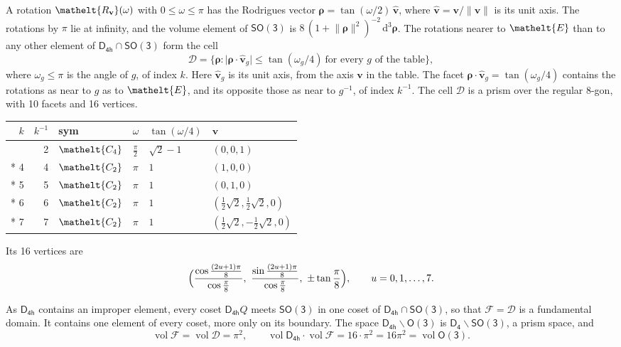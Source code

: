 \documentclass[10pt,a4paper]{article}
\numberwithin{equation}{section}
\newcommand{\eltfont}[1]{{\let\sigma\eltsigma\mathelt{#1}}}
\newcommand{\grp}[1]{\mathsf{#1}}
\newcommand{\cls}[1]{\eltfont{#1}}
\newcommand{\elt}[1]{\eltfont{#1}}
\newcommand{\dirvec}[3]{(#1, #2, #3)}
\newcommand{\unitaxis}{\hat{\mathbf{v}}}
\newcommand{\vv}{\mathbf{v}}
\newcommand{\diff}{\mathrm{d}}
\newcommand{\vol}{\operatorname{vol}}
\newcommand{\rodrigues}{\boldsymbol{\rho}}
\newcommand{\fcell}{\mathcal{D}}
\newcommand{\fdomain}{\mathcal{F}}
\begin{document}
\leavevmode\label{n:vector.rodrigues}\label{n:vector.unitaxis}A rotation $\elt{R_{\vv}}(\omega)$ with $0 \le \omega \le \pi$ has the Rodrigues vector $\rodrigues = \tan(\omega/2)\,\unitaxis$, where $\unitaxis = \vv/\lVert\vv\rVert$ is its unit axis. The rotations by $\pi$ lie at infinity, and the volume element of \href{SO3.pdf}{$\grp{SO(3)}$} is $8\,(1 + \lVert\rodrigues\rVert^2)^{-2}\,\diff^3\rodrigues$.
\leavevmode\label{n:set.cell}The rotations nearer to $\elt{E}$ than to any other element of $\grp{D_{4h}} \cap \grp{SO(3)}$ form the cell
\begin{equation}\label{e:cell}\fcell = \bigl\{\rodrigues : \lvert\rodrigues\cdot\unitaxis_g\rvert \le \tan(\omega_g/4)\ \text{for every $g$ of the table}\bigr\},\end{equation}
where $\omega_g \le \pi$ is the angle of $g$, of index $k$. Here $\unitaxis_g$ is its unit axis, from the axis $\vv$ in the table. The facet $\rodrigues\cdot\unitaxis_g = \tan(\omega_g/4)$ contains the rotations as near to $g$ as to $\elt{E}$, and its opposite those as near to $g^{-1}$, of index $k^{-1}$. The cell $\fcell$ is a prism over the regular 8-gon, with 10 facets and 16 vertices.
{\small{\renewcommand{\arraystretch}{1.3}\begin{longtable}{@{}rrllll@{}}\toprule
$k$ & $k^{-1}$ & sym & $\omega$ & $\tan(\omega/4)$ & $\vv$\\\midrule\endhead
\bottomrule\endfoot\endlastfoot
1 & 2 & $\cls{C_{4}}$ & $\tfrac{\pi}{2}$ & $\sqrt{2} - 1$ & $\dirvec{0}{0}{1}$\\*
4 & 4 & $\cls{C_{2}}$ & $\pi$ & $1$ & $\dirvec{1}{0}{0}$\\*
5 & 5 & $\cls{C_{2}}$ & $\pi$ & $1$ & $\dirvec{0}{1}{0}$\\*
6 & 6 & $\cls{C_{2}}$ & $\pi$ & $1$ & $\dirvec{\tfrac{1}{2}\sqrt{2}}{\tfrac{1}{2}\sqrt{2}}{0}$\\*
7 & 7 & $\cls{C_{2}}$ & $\pi$ & $1$ & $\dirvec{\tfrac{1}{2}\sqrt{2}}{-\tfrac{1}{2}\sqrt{2}}{0}$\\
\bottomrule\end{longtable}}}
\leavevmode\label{n:local.vertex.u}Its 16 vertices are
\begin{equation}\label{e:prism}\Bigl(\frac{\cos\frac{(2u+1)\pi}{8}}{\cos\frac{\pi}{8}},\ \frac{\sin\frac{(2u+1)\pi}{8}}{\cos\frac{\pi}{8}},\ \pm\tan\frac{\pi}{8}\Bigr),\qquad u = 0, 1, \dots, 7.\end{equation}

\leavevmode\label{n:set.fundamental}As $\grp{D_{4h}}$ contains an improper element, every coset $\grp{D_{4h}}Q$ meets \href{SO3.pdf}{$\grp{SO(3)}$} in one coset of $\grp{D_{4h}} \cap \grp{SO(3)}$, so that $\fdomain = \fcell$ is a fundamental domain. It contains one element of every coset, more only on its boundary.
The space $\grp{D_{4h}}\backslash\grp{O(3)}$ is $\grp{D_{4}}\backslash\grp{SO(3)}$, a prism space, and
\begin{equation}\label{e:volume}\vol\fdomain = \vol\fcell = \pi^2,\qquad \vol\grp{D_{4h}}\cdot\vol\fdomain = 16\cdot \pi^2 = 16\pi^2 = \vol\grp{O(3)}.\end{equation}
\end{document}
